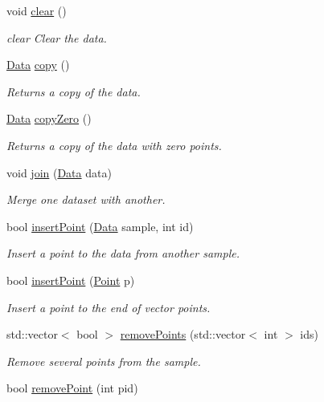\begin{DoxyCompactItemize}
void \hyperlink{class_data_a44b749f64ffa35e034f9503fdec4917e}{clear} ()
\begin{DoxyCompactList}\small\item\em clear Clear the data. \end{DoxyCompactList}\item 
\hyperlink{class_data}{Data} \hyperlink{class_data_afb7687021aa7d5f1ecae464eee601710}{copy} ()
\begin{DoxyCompactList}\small\item\em Returns a copy of the data. \end{DoxyCompactList}\item 
\hyperlink{class_data}{Data} \hyperlink{class_data_ae9f7aeb470be537dc20c43b317dc6478}{copy\+Zero} ()
\begin{DoxyCompactList}\small\item\em Returns a copy of the data with zero points. \end{DoxyCompactList}\item 
void \hyperlink{class_data_a83c2a01ded98c4fad0b5b31538039046}{join} (\hyperlink{class_data}{Data} data)
\begin{DoxyCompactList}\small\item\em Merge one dataset with another. \end{DoxyCompactList}\item 
bool \hyperlink{class_data_abb6aade47d78a284301c32e82b2cbee2}{insert\+Point} (\hyperlink{class_data}{Data} sample, int id)
\begin{DoxyCompactList}\small\item\em Insert a point to the data from another sample. \end{DoxyCompactList}\item 
bool \hyperlink{class_data_a4694df7867fa112b219bbf6ed17880e9}{insert\+Point} (\hyperlink{class_point}{Point} p)
\begin{DoxyCompactList}\small\item\em Insert a point to the end of vector points. \end{DoxyCompactList}\item 
std\+::vector$<$ bool $>$ \hyperlink{class_data_a6cc376e614e5440061c66833e1c8d30a}{remove\+Points} (std\+::vector$<$ int $>$ ids)
\begin{DoxyCompactList}\small\item\em Remove several points from the sample. \end{DoxyCompactList}\item 
bool \hyperlink{class_data_ad927494a13a5018ff3644212d7234a03}{remove\+Point} (int pid)

\end{DoxyCompactItemize}
